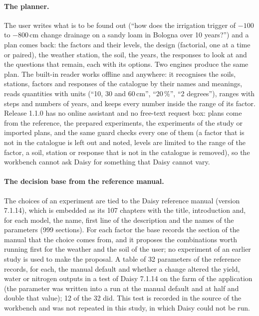 \paragraph{The planner.}\label{sec:planner}
The user writes what is to be found out (``how does the irrigation trigger of $-100$ to $-800$\,cm change drainage on a sandy loam in Bologna over 10 years?'') and a plan comes back: the factors and their levels, the design (factorial, one at a time or paired), the weather station, the soil, the years, the responses to look at and the questions that remain, each with its options. Two engines produce the same plan. The built-in reader works offline and anywhere: it recognises the soils, stations, factors and responses of the catalogue by their names and meanings, reads quantities with units (``10, 30 and 60\,cm'', ``20\,\%'', ``2 degrees''), ranges with steps and numbers of years, and keeps every number inside the range of its factor. Release 1.1.0 has no online assistant and no free-text request box: plans come from the reference, the prepared experiments, the experiments of the study or imported plans, and the same guard checks every one of them (a factor that is not in the catalogue is left out and noted, levels are limited to the range of the factor, a soil, station or response that is not in the catalogue is removed), so the workbench cannot ask Daisy for something that Daisy cannot vary.

\paragraph{The decision base from the reference manual.}
The choices of an experiment are tied to the Daisy reference manual (version 7.1.14), which is embedded as its 107 chapters with the title, introduction and, for each model, the name, first line of the description and the names of the parameters (999 sections). For each factor the base records the section of the manual that the choice comes from, and it proposes the combinations worth running first for the weather and the soil of the user; no experiment of an earlier study is used to make the proposal. A table of 32 parameters of the reference records, for each, the manual default and whether a change altered the yield, water or nitrogen outputs in a test of Daisy 7.1.14 on the farm of the application (the parameter was written into a run at the manual default and at half and double that value); 12 of the 32 did. This test is recorded in the source of the workbench and was not repeated in this study, in which Daisy could not be run.

